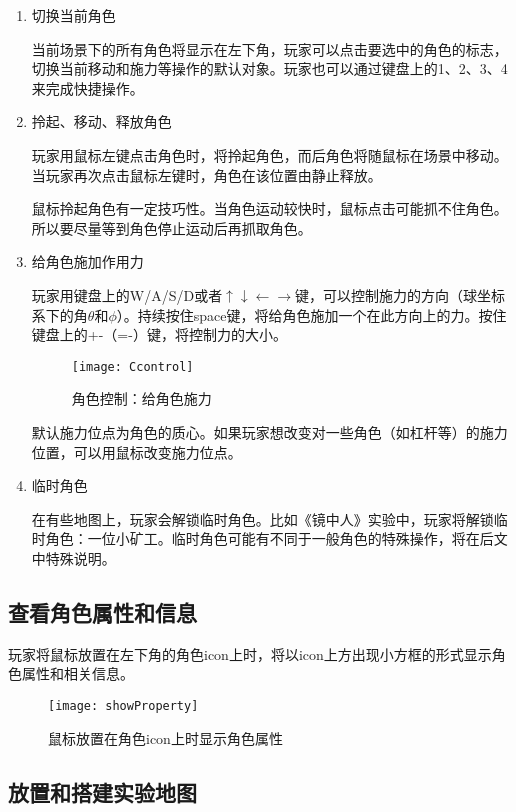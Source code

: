 \documentclass{tstextbook}
\begin{document}
\begin{enumerate}

\item{切换当前角色}

当前场景下的所有角色将显示在左下角，玩家可以点击要选中的角色的标志，切换当前移动和施力等操作的默认对象。玩家也可以通过键盘上的1、2、3、4来完成快捷操作。

\item{拎起、移动、释放角色}

玩家用鼠标左键点击角色时，将拎起角色，而后角色将随鼠标在场景中移动。当玩家再次点击鼠标左键时，角色在该位置由静止释放。

鼠标拎起角色有一定技巧性。当角色运动较快时，鼠标点击可能抓不住角色。所以要尽量等到角色停止运动后再抓取角色。

\item{给角色施加作用力}

玩家用键盘上的W/A/S/D或者$\uparrow\downarrow\leftarrow\rightarrow$键，可以控制施力的方向（球坐标系下的角$\theta$和$\phi$）。持续按住space键，将给角色施加一个在此方向上的力。按住键盘上的+-（=-）键，将控制力的大小。

\begin{figure}[H]
\centering
\texttt{[image: Ccontrol]} 
\caption{角色控制：给角色施力}
\label{Ccontrol}
\end{figure}

默认施力位点为角色的质心。如果玩家想改变对一些角色（如杠杆等）的施力位置，可以用鼠标改变施力位点。

\item{临时角色}

在有些地图上，玩家会解锁临时角色。比如《镜中人》实验中，玩家将解锁临时角色：一位小矿工。临时角色可能有不同于一般角色的特殊操作，将在后文中特殊说明。

\end{enumerate}

\subsection{查看角色属性和信息}

玩家将鼠标放置在左下角的角色icon上时，将以icon上方出现小方框的形式显示角色属性和相关信息。

\begin{figure}[H]
\centering
\texttt{[image: showProperty]} 
\caption{鼠标放置在角色icon上时显示角色属性}
\label{property}
\end{figure}

\subsection{放置和搭建实验地图}
\end{document}
